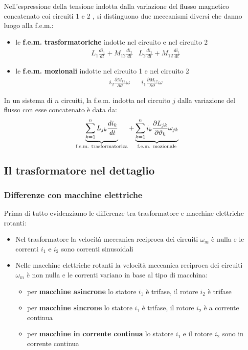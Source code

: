 \documentclass{article}
\begin{document}
Nell'espressione della tensione indotta dalla
variazione del flusso magnetico concatenato
coi circuiti 1 e 2 , si distinguono due meccanismi diversi che danno luogo alla f.e.m.:
\begin{itemize}
    \item le \textbf{f.e.m. trasformatoriche} indotte nel circuito e nel circuito 2
    \begin{align*}
        &L_1 \frac{di_1}{dt} + M_{12} \frac{di_2}{dt}
        &
        L_2 \frac{di_2}{dt} + M_{12} \frac{di_1}{dt}
    \end{align*}
    \item le \textbf{f.e.m. mozionali} indotte nel circuito 1 e nel circuito 2
    \begin{align*}
        &i_2 \frac{\partial M_{12}}{\partial \vartheta} \omega
        &
        &i_1 \frac{\partial M_{12}}{\partial \vartheta} \omega
    \end{align*}
\end{itemize}
In un sistema di $n$ circuiti, la f.e.m. indotta nel circuito $j$ dalla variazione del flusso con esse concatenato è data da:
\[\underbrace{\sum_{k=1}^n L_{jk} \frac{di_k}{dt}}_{\text{f.e.m. trasformatorica}}+ \underbrace{\sum_{k=1}^n i_k \frac{\partial L_{jk}}{\partial \vartheta_k}\omega_{jk}}_{\text{f.e.m. mozionale}}\]




\subsection{Il trasformatore nel dettaglio}
\subsubsection{Differenze con macchine elettriche}
Prima di tutto evidenziamo le differenze tra trasformatore e macchine elettriche rotanti:
\begin{itemize}
    \item Nel trasformatore la velocità meccanica reciproca dei circuiti $\omega_m$ è nulla e le correnti $i_1$ e $i_2$ sono correnti sinusoidali
    \item Nelle macchine elettriche rotanti la velocità meccanica reciproca dei circuiti $\omega_m$ è non nulla e le correnti variano in base al tipo di macchina:
    \begin{itemize}
        \item per \textbf{macchine asincrone} lo statore $i_1$ è trifase, il rotore $i_2$ è trifase
        \item per \textbf{macchine sincrone} lo statore $i_1$ è trifase, il rotore $i_2$ è a corrente continua
        \item per \textbf{macchine in corrente continua} lo statore $i_1$ e il rotore $i_2$ sono in corrente continua
    \end{itemize}
\end{itemize}
\end{document}
